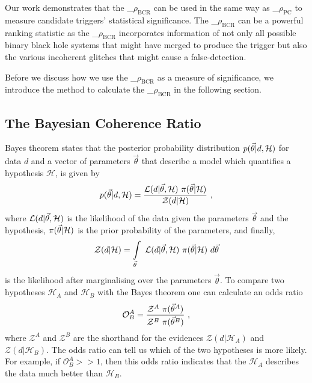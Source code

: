 \documentclass[%
 nofootinbib,
 amsmath,amssymb,
 aps,
 twocolumn
]{revtex4-2}
\newcommand{\mathcmd}[1]{{\sc \relax\ifmmode#1\else $#1$\fi}\xspace}
\newcommand{\bcr}{\mathcmd{\rho_\text{BCR}}}
\newcommand{\pycbcstat}{\mathcmd{\rho_\text{PC}}}
\newcommand{\parameters}{\mathcmd{\vec{\theta}}}
\begin{document}
Our work demonstrates that the \bcr can be used in the same way as \pycbcstat to measure candidate triggers' statistical significance.  The \bcr can be a powerful ranking statistic as the \bcr incorporates information of not only all possible binary black hole systems that might have merged to produce the trigger but also the various incoherent glitches that might cause a false-detection. 

Before we discuss how we use the \bcr as a measure of significance, we introduce the method to calculate the \bcr in the following section.


\subsection{The Bayesian Coherence Ratio}

Bayes theorem states that the posterior probability distribution $p(\parameters|d,\mathcal{H})$ for data $d$ and a vector of parameters \parameters that describe a model which quantifies a hypothesis $\mathcal{H}$, is given by
\begin{equation}
p(\parameters|d,\mathcal{H}) = \frac{\mathcal{L}(d|\parameters, \mathcal{H}) \ \pi(\parameters | \mathcal{H})}{\mathcal{Z}(d|\mathcal{H})}\ , 
\end{equation}
where $\mathcal{L}(d|\parameters, \mathcal{H})$ is the likelihood of the data given the parameters \parameters and the hypothesis, $\pi(\parameters | \mathcal{H})$ is the prior probability of the parameters, and finally,
\begin{equation}
    \mathcal{Z}(d|\mathcal{H}) = \int\limits_{\parameters} \ \mathcal{L}(d|\parameters,\mathcal{H}) \ \pi(\parameters | \mathcal{H}) \ d\parameters
\end{equation} is the likelihood after marginalising over the parameters \parameters.  To compare two hypotheses $\mathcal{H}_A$ and $\mathcal{H}_B$ with the Bayes theorem one can calculate an odds ratio
\begin{equation}
    \mathcal{O}^A_B = \frac{\mathcal{Z}^A\ \pi(\parameters^A)}{\mathcal{Z}^B\ \pi(\parameters^B)}\ ,
\end{equation}
where $\mathcal{Z}^A$ and $\mathcal{Z}^B$ are the shorthand for the evidences  $\mathcal{Z}(d|\mathcal{H}_A)$ and $\mathcal{Z}(d|\mathcal{H}_B)$. The odds ratio can tell us which of the two hypotheses is more likely. For example, if $\mathcal{O}^A_B >> 1$, then this odds ratio indicates that the $\mathcal{H}_A$ describes the data much better than $\mathcal{H}_B$. 
\end{document}
